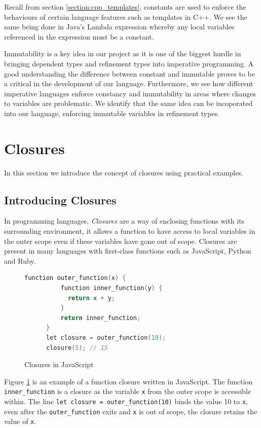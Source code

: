 \documentclass[a4paper,12pt]{report}
\begin{document}
\par
Recall from section \ref{section:cpp_templates}, constants are used to enforce 
the behaviours of certain language features such as templates in C++. 
We see the same being done in Java's Lambda expression whereby any local variables 
referenced in the expression must be a constant. 

\par
Immutability is a key idea in our project as it is one of the biggest hurdle in 
bringing dependent types and refinement types into imperative programming. A 
good understanding the difference between constant and immutable proves to be a 
critical in the development of our language. Furthermore, we see how different 
imperative languages enforce constancy and immutability in areas where changes 
to variables are problematic. We identify that the same idea can be 
incoporated into our language, enforcing immutable variables in refinement types. 

\section{Closures} \label{section:closures}
In this section we introduce the concept of closures using practical examples. 

\subsection{Introducing Closures}
In programming languages, \textit{Closures} are a way of enclosing functions 
with its surrounding environment, it allows a function to have access to local 
variables in the outer scope even if these variables have gone out of scope. 
Closures are present in many languages with first-class functions such as 
JavaScript, Python and Ruby. 

\begin{figure}[h]
  \begin{center}
    \begin{lstlisting}[language=C]
      function outer_function(x) {
          function inner_function(y) {
            return x + y;
          }
          return inner_function;
      }
      let closure = outer_function(10);
      closure(5); // 15
    \end{lstlisting}    
  \end{center}
  \caption{Closures in JavaScript}
  \label{code:clousure_js}
\end{figure}

Figure \ref{code:clousure_js} is an example of a function closure written in 
JavaScript. The function \verb|inner_function| is a closure as the variable 
\verb|x| from the outer scope is accessible within. The line 
\verb|let closure = outer_function(10)| binds the value 10 to \verb|x|, even after the 
\verb|outer_function| exits and \verb|x| is out of scope, the closure retains 
the value of \verb|x|.
\end{document}
